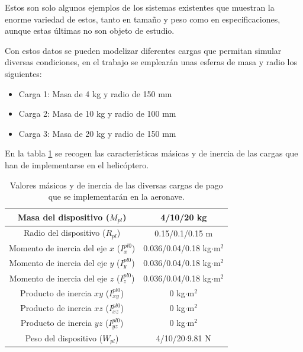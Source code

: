 Estos son solo algunos ejemplos de los sistemas existentes que muestran la enorme variedad de estos, tanto en tamaño y peso como en especificaciones, aunque estas últimas no son objeto de estudio.

Con estos datos se pueden modelizar diferentes cargas que permitan simular diversas condiciones, en el trabajo se emplearán  unas esferas de masa y radio los siguientes:

\begin{itemize}
	\item Carga 1: Masa de 4 kg y radio de 150 mm
	\item Carga 2: Masa de 10 kg y radio de 100 mm
	\item Carga 3: Masa de 20 kg y radio de 150 mm
\end{itemize}

En la tabla \ref{tablaPL} se recogen las características másicas y de inercia de las cargas que han de implementarse en el helicóptero.

\begin{table}[htbp]
	\centering
	\begin{tabular}{|>{\columncolor{Gray}}c|c|}
		\hline
		\cellcolor{Gray}Masa del dispositivo ($M_{pl}$) & 4/10/20 kg \\ \hline
		\cellcolor{Gray}Radio del dispositivo ($R_{pl}$) & 0.15/0.1/0.15 m \\ \hline
		\cellcolor{Gray}Momento de inercia del eje $x$ ($I_{x}^{pl0}$) & 0.036/0.04/0.18 kg$\cdot$m$^2$ \\ \hline
		\cellcolor{Gray}Momento de inercia del eje $y$ ($I_{y}^{pl0}$) & 0.036/0.04/0.18 kg$\cdot$m$^2$ \\ \hline
		\cellcolor{Gray}Momento de inercia del eje $z$ ($I_{z}^{pl0}$) & 0.036/0.04/0.18 kg$\cdot$m$^2$ \\ \hline
		\cellcolor{Gray}Producto de inercia $xy$ ($I_{xy}^{pl0}$)& 0 kg$\cdot$m$^2$ \\ \hline
		\cellcolor{Gray}Producto de inercia $xz$ ($I_{xz}^{pl0}$)& 0 kg$\cdot$m$^2$ \\ \hline
		\cellcolor{Gray}Producto de inercia $yz$ ($I_{yz}^{pl0}$)& 0 kg$\cdot$m$^2$ \\ \hline
		\cellcolor{Gray}Peso del dispositivo ($W_{pl}$)& 4/10/20$\cdot$9.81 N \\ \hline
	\end{tabular}%
	\caption{Valores másicos y de inercia de las diversas cargas de pago que se implementarán en la aeronave.}
	\label{tablaPL}
\end{table}%


